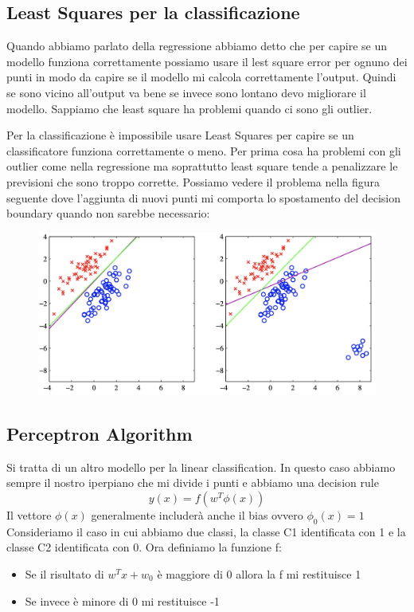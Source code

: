\documentclass[14pt]{extreport}
\begin{document}
\subsection{Least Squares per la classificazione}

Quando abbiamo parlato della regressione abbiamo detto che per capire se un modello funziona correttamente possiamo usare il lest square error per
ognuno dei punti in modo da capire se il modello mi calcola correttamente l'output. Quindi se sono vicino all'output va bene se invece sono lontano
devo migliorare il modello. Sappiamo che least square ha problemi quando ci sono gli outlier.

Per la classificazione è impossibile usare Least Squares per capire se un classificatore funziona correttamente o meno. Per prima cosa ha problemi con
gli outlier come nella regressione ma soprattutto least square tende a penalizzare le previsioni che sono troppo corrette. Possiamo vedere il problema
nella figura seguente dove l'aggiunta di nuovi punti mi comporta lo spostamento del decision boundary quando non sarebbe necessario:

\begin{figure}[H]
\centering
\includegraphics[width=0.7\linewidth]{196.jpeg}
\end{figure}

\subsection{Perceptron Algorithm}

Si tratta di un altro modello per la linear classification. In questo caso abbiamo sempre il nostro iperpiano che mi divide i punti e abbiamo una
decision rule $$y(x) = f(w^T\phi(x))$$ Il vettore $\phi(x)$ generalmente includerà anche il bias ovvero $\phi_0(x)=1$ Consideriamo il caso in cui
abbiamo due classi, la classe C1 identificata con 1 e la classe C2 identificata con 0. Ora definiamo la funzione f:
\begin{itemize}
\item Se il risultato di $w^Tx + w_0$ è maggiore di 0 allora la f mi restituisce 1
\item Se invece è minore di 0 mi restituisce -1
\end{itemize}
\end{document}
